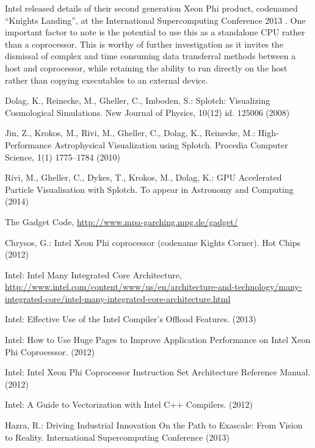 \documentclass[runningheads,a4paper]{llncs}
\begin{document}
Intel released details of their second generation Xeon Phi product, codenamed “Knights Landing”,  at the International Supercomputing 
Conference 2013 \cite{knightlanding}. One important factor to note is the potential to use this as a standalone CPU rather than a coprocessor. 
This is worthy of further investigation as it invites the dismissal of complex and time consuming data transferral methods between 
a host and coprocessor, while retaining the ability to run directly on the host rather than copying executables to an external device.

\begin{thebibliography}{4}

Dolag, K., Reinecke, M., Gheller, C., Imboden, S.: Splotch: Visualizing Cosmological Simulations. New Journal of Physics, 10(12)  id. 125006 (2008)

Jin, Z., Krokos, M., Rivi, M., Gheller, C., Dolag, K., Reinecke, M.: High-Performance Astrophysical Visualization using Splotch. 
  Procedia Computer Science, 1(1) 1775--1784 (2010)

Rivi, M., Gheller, C., Dykes, T., Krokos, M., Dolag, K.:  GPU Accelerated
  Particle Visualisation with Splotch. To appear in Astronomy and Computing (2014)
 
The Gadget Code, \url{http://www.mpa-garching.mpg.de/gadget/}  
  
Chrysos, G.: Intel Xeon Phi coprocessor (codename Kights Corner). 
  Hot Chips (2012) 

Intel: Intel Many Integrated Core Architecture, 
  \url{http://www.intel.com/content/www/us/en/architecture-and-technology/many-integrated-core/intel-many-integrated-core-architecture.html}

 Intel: Effective Use of the Intel Compiler's Offload Features. (2013)

Intel: How to Use Huge Pages to Improve Application Performance on Intel Xeon Phi Coprocessor. (2012)

Intel: Intel Xeon Phi Coprocessor Instruction Set Architecture Reference Manual. (2012)

Intel: A Guide to Vectorization with Intel C++ Compilers. (2012)

Hazra, R.: Driving Industrial Innovation On the Path to Exascale: From Vision to Reality. 
  International Supercomputing Conference (2013)

\end{thebibliography}
\end{document}
